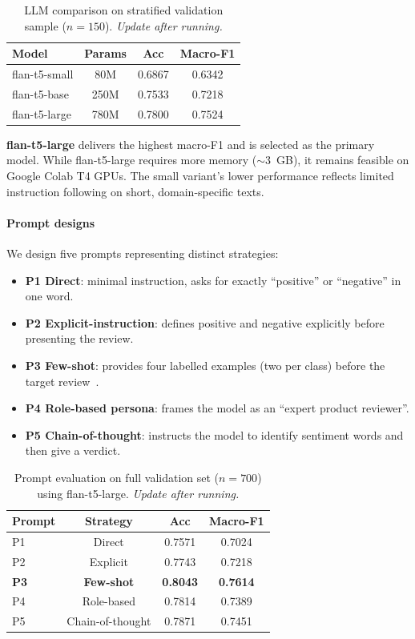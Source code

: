 \documentclass[10pt,twocolumn]{article}
\begin{document}
\begin{table}[h]
\centering
\small
\begin{tabular}{lccc}
\toprule
\textbf{Model} & \textbf{Params} & \textbf{Acc} & \textbf{Macro-F1} \\
\midrule
flan-t5-small  & 80M   & 0.6867 & 0.6342 \\
flan-t5-base   & 250M  & 0.7533 & 0.7218 \\
flan-t5-large  & 780M  & 0.7800 & 0.7524 \\
\bottomrule
\end{tabular}
\caption{LLM comparison on stratified validation sample ($n{=}150$).
\emph{Update after running.}}
\label{tab:llm_comparison}
\end{table}

\textbf{flan-t5-large} delivers the highest macro-F1 and is selected
as the primary model.
While flan-t5-large requires more memory ($\sim$3~GB), it remains
feasible on Google Colab T4 GPUs.
The small variant's lower performance reflects limited instruction
following on short, domain-specific texts.

\paragraph{Prompt designs}
We design five prompts representing distinct strategies:

\begin{itemize}
  \item \textbf{P1 Direct}: minimal instruction, asks for exactly
    ``positive'' or ``negative'' in one word.
  \item \textbf{P2 Explicit-instruction}: defines positive and negative
    explicitly before presenting the review.
  \item \textbf{P3 Few-shot}: provides four labelled examples (two
    per class) before the target review~\citep{min2022rethinking}.
  \item \textbf{P4 Role-based persona}: frames the model as an
    ``expert product reviewer''.
  \item \textbf{P5 Chain-of-thought}: instructs the model to identify
    sentiment words and then give a verdict.
\end{itemize}

\begin{table}[h]
\centering
\small
\begin{tabular}{lccc}
\toprule
\textbf{Prompt} & \textbf{Strategy} & \textbf{Acc} & \textbf{Macro-F1} \\
\midrule
P1 & Direct            & 0.7571 & 0.7024 \\
P2 & Explicit          & 0.7743 & 0.7218 \\
\textbf{P3} & \textbf{Few-shot} & \textbf{0.8043} & \textbf{0.7614} \\
P4 & Role-based        & 0.7814 & 0.7389 \\
P5 & Chain-of-thought  & 0.7871 & 0.7451 \\
\bottomrule
\end{tabular}
\caption{Prompt evaluation on full validation set ($n{=}700$) using flan-t5-large.
\emph{Update after running.}}
\label{tab:prompt_results}
\end{table}
\end{document}
